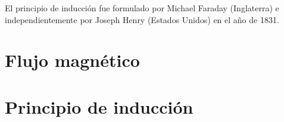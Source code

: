 %
%


El principio de inducción fue formulado por Michael Faraday  (Inglaterra) e independientemente por Joseph Henry (Estados Unidos) en el a\~no de 1831.

\section{Flujo magnético}

\section{Principio de inducción}



%


